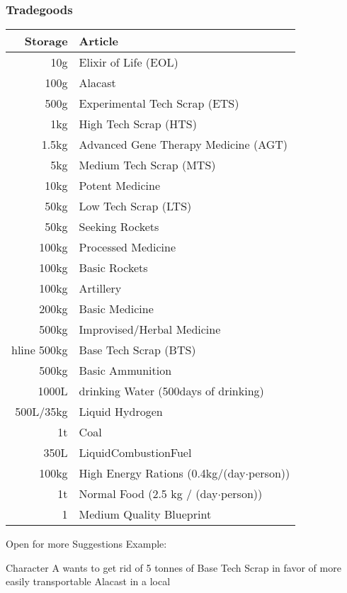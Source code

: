     \subsubsection{Tradegoods}
    \begin{tabular}{|r|l|}
        \hline
        Storage & Article\\\hline
         10g & Elixir of Life (EOL)\\\hline
        100g & Alacast\\\hline
        500g & Experimental Tech Scrap (ETS)\\\hline
        1kg & High Tech Scrap (HTS)\\\hline
        1.5kg & Advanced Gene Therapy Medicine (AGT)\\\hline
        5kg & Medium Tech Scrap (MTS)\\\hline
        10kg & Potent Medicine\\\hline
        50kg & Low Tech Scrap (LTS)\\\hline
        50kg & Seeking Rockets\\\hline
        100kg & Processed Medicine\\\hline
        100kg & Basic Rockets\\\hline
        100kg & Artillery\\\hline
        200kg & Basic Medicine\\\hline
        500kg & Improvised/Herbal Medicine\\hline
        500kg & Base Tech Scrap (BTS)\\\hline
        500kg & Basic Ammunition\\\hline
        1000L & drinking Water (500days of drinking)\\\hline
        500L/35kg & Liquid Hydrogen\\\hline
        1t & Coal\\\hline
        350L & LiquidCombustionFuel\\\hline
        100kg & High Energy Rations (0.4kg/(day\(\cdot\)person))\\\hline
        1t & Normal Food (2.5 kg / (day\(\cdot\)person))\\\hline
        1 & Medium Quality Blueprint\\\hline
    \end{tabular}\par
    Open for more Suggestions\vspace{1.5cm}
    Example:\par
    Character A wants to get rid of 5 tonnes of Base Tech Scrap in favor of more easily transportable Alacast in a local
